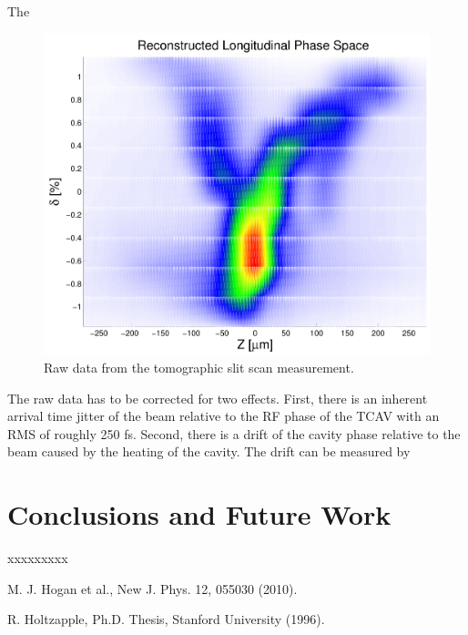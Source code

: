 \documentclass[%
twocolumn,
showpacs,preprintnumbers,
 aps,
prstab,
]{revtex4-1}
\begin{document}
The 

\begin{figure}[hbt]
  \includegraphics[width=\columnwidth]{figures/test.pdf}
  \caption{Raw data from the tomographic slit scan measurement.}
  \label{ps}
\end{figure}

The raw data has to be corrected for two effects. First, there is an inherent arrival time jitter of the beam relative to the RF phase of the TCAV with an RMS of roughly 250 fs. Second, there is a drift of the cavity phase relative to the beam caused by the heating of the cavity. The drift can be measured by 


\section{Conclusions and Future Work} \label{sec:con}


xxxxxxxxx






\begin{thebibliography}{99}

 M. J. Hogan et al., New J. Phys. 12, 055030 (2010).

 R. Holtzapple, Ph.D. Thesis, Stanford University (1996).

\end{thebibliography}
\end{document}
